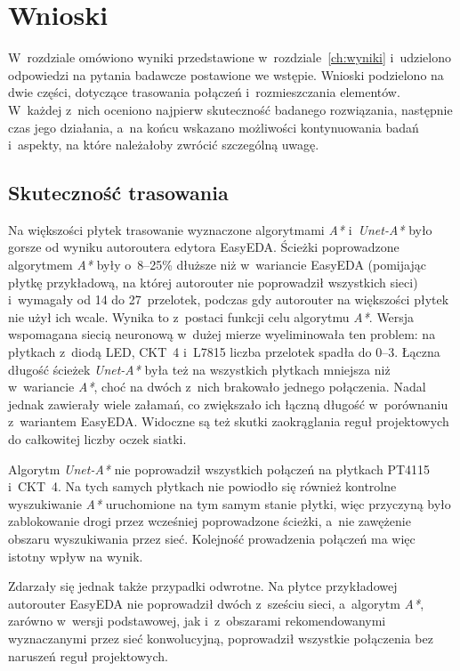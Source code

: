 \chapter{Wnioski}
\label{ch:wnioski}

W~rozdziale omówiono wyniki przedstawione w~rozdziale~\ref{ch:wyniki}
i~udzielono odpowiedzi na pytania badawcze postawione we wstępie.
Wnioski podzielono na dwie części, dotyczące trasowania połączeń
i~rozmieszczania elementów. W~każdej z~nich oceniono najpierw
skuteczność badanego rozwiązania, następnie czas jego działania,
a~na końcu wskazano możliwości kontynuowania badań i~aspekty, na które
należałoby zwrócić szczególną uwagę.

\section{Skuteczność trasowania}

Na większości płytek trasowanie wyznaczone algorytmami \emph{A*}
i~\emph{Unet-A*} było gorsze od wyniku autoroutera edytora EasyEDA.
Ścieżki poprowadzone algorytmem \emph{A*} były o~8--25\% dłuższe niż
w~wariancie EasyEDA (pomijając płytkę przykładową, na której autorouter
nie poprowadził wszystkich sieci) i~wymagały od 14 do 27~przelotek,
podczas gdy autorouter na większości płytek nie użył ich wcale. Wynika
to z~postaci funkcji celu algorytmu \emph{A*}. Wersja wspomagana siecią neuronową w~dużej mierze
wyeliminowała ten problem: na płytkach z~diodą LED, CKT~4 i~L7815
liczba przelotek spadła do 0--3. Łączna długość ścieżek \emph{Unet-A*} była też
na wszystkich płytkach mniejsza niż w~wariancie \emph{A*}, choć na
dwóch z~nich brakowało jednego połączenia. Nadal jednak
zawierały wiele załamań, co zwiększało ich łączną długość
w~porównaniu z~wariantem EasyEDA. Widoczne są też skutki zaokrąglania
reguł projektowych do całkowitej liczby oczek siatki.

Algorytm \emph{Unet-A*} nie poprowadził wszystkich połączeń na płytkach
PT4115 i~CKT~4. Na tych samych płytkach nie powiodło się również
kontrolne wyszukiwanie \emph{A*} uruchomione na tym samym stanie
płytki, więc przyczyną było zablokowanie drogi przez wcześniej
poprowadzone ścieżki, a~nie zawężenie obszaru wyszukiwania przez sieć.
Kolejność prowadzenia połączeń ma więc istotny wpływ na wynik.

Zdarzały się jednak także przypadki odwrotne. Na płytce przykładowej
autorouter EasyEDA nie poprowadził dwóch z~sześciu sieci, a~algorytm
\emph{A*}, zarówno w~wersji podstawowej, jak i~z~obszarami
rekomendowanymi wyznaczanymi przez sieć konwolucyjną, poprowadził
wszystkie połączenia bez naruszeń reguł projektowych.

